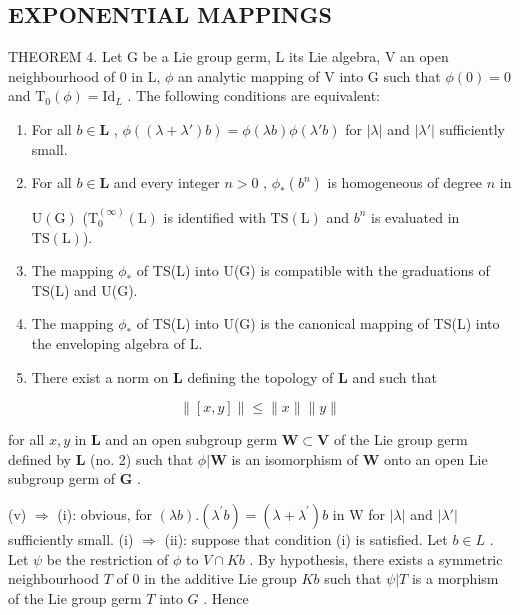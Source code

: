 \subsection{EXPONENTIAL MAPPINGS}

THEOREM 4. Let G be a Lie group germ, L its Lie algebra, V an open neighbourhood of 0 in L, \(\phi\) an analytic mapping of V into G such that \(\phi(0) = 0\) and \(\mathrm{T}_0(\phi) = \mathrm{Id}_L\) . The following conditions are equivalent:

\begin{enumerate}
\def\labelenumi{(\roman{enumi})}
\item
  For all \(b \in \mathbf{L}\) , \(\phi((\lambda + \lambda')b) = \phi(\lambda b)\phi(\lambda'b)\) for \(|\lambda|\) and \(|\lambda'|\) sufficiently small.
\item
  For all \(b \in \mathbf{L}\) and every integer \(n > 0\) , \(\phi_{*}(b^{n})\) is homogeneous of degree \(n\) in

\(\mathrm{U}(\mathrm{G})\) (\(\mathrm{T}_{0}^{(\infty)}(\mathrm{L})\) is identified with \(\mathrm{TS}(\mathrm{L})\) and \(b^{n}\) is evaluated in \(\mathrm{TS}(\mathrm{L})\)).

\item
  The mapping \(\phi_{*}\) of TS(L) into U(G) is compatible with the graduations of TS(L) and U(G).
\item
  The mapping \(\phi_*\) of TS(L) into U(G) is the canonical mapping of TS(L) into the enveloping algebra of L.
\item
  There exist a norm on \(\mathbf{L}\) defining the topology of \(\mathbf{L}\) and such that
\end{enumerate}

\[
\| [ x, y ] \| \leqslant \| x \| \| y \|
\]

for all \(x, y\) in \(\mathbf{L}\) and an open subgroup germ \(\mathbf{W} \subset \mathbf{V}\) of the Lie group germ defined by \(\mathbf{L}\) (no. 2) such that \(\phi | \mathbf{W}\) is an isomorphism of \(\mathbf{W}\) onto an open Lie subgroup germ of \(\mathbf{G}\) .

(v) \(\Rightarrow\) (i): obvious, for \((\lambda b).(\lambda^{\prime}b) = (\lambda +\lambda^{\prime})b\) in W for \(|\lambda |\) and \(|\lambda '|\) sufficiently small.
(i) \(\Rightarrow\) (ii): suppose that condition (i) is satisfied. Let \(b \in L\) . Let \(\psi\) be the restriction of \(\phi\) to \(V \cap Kb\) . By hypothesis, there exists a symmetric neighbourhood \(T\) of 0 in the additive Lie group \(Kb\) such that \(\psi|T\) is a morphism of the Lie group germ \(T\) into \(G\) . Hence

